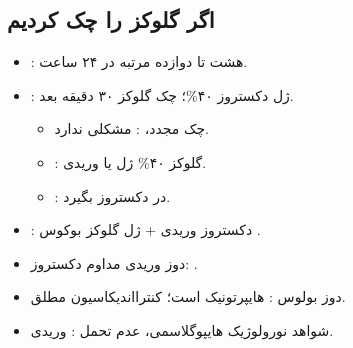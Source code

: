 \documentclass[12pt,a4paper]{article}
\begin{document}
\subsection*{اگر گلوکز را چک کردیم}
\begin{itemize}
\item {}: هشت تا دوازده مرتبه  در ۲۴ ساعت.
\item {}: ژل دکستروز ۴۰\%؛ چک گلوکز ۳۰ دقیقه بعد.
  \begin{itemize}
  \item چک مجدد، : مشکلی ندارد.
  \item {}: گلوکز ۴۰\% ژل یا وریدی.
  \item {}: در  دکستروز بگیرد.
  \end{itemize}
\item {}: دکستروز وریدی + ژل گلوکز بوکوس .
\end{itemize}
\begin{itemize}
\item دوز وریدی مداوم دکستروز: .
\item دوز بولوس : هایپرتونیک است؛ کنترااندیکاسیون مطلق.
\item شواهد نورولوژیک هایپوگلاسمی، عدم تحمل :  وریدی.
\end{itemize}

\clearpage
\end{document}
